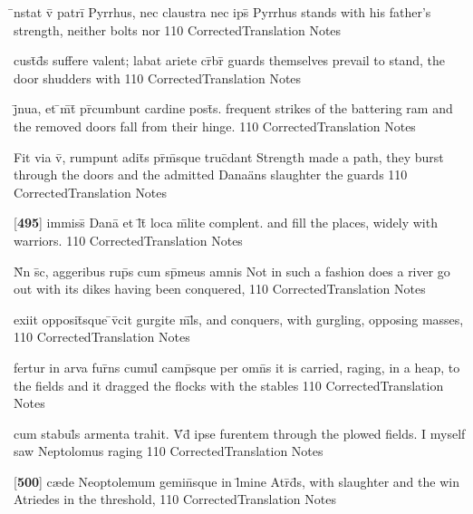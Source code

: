 \latline
  {\={}nstat v\={\macron {\i}} patri\={} Pyrrhus, nec claustra nec ips\={\macron {\i}} }
  { Pyrrhus stands with his father's strength, neither bolts nor  }
  {110}
  { CorrectedTranslation }
  { Notes }


\latline
  {cust\={}d\={}s suffere valent; labat ariete cr\={}br\={}}
  { guards themselves prevail to stand, the door shudders with  }
  {110}
  { CorrectedTranslation }
  { Notes }


\latline
  {j\={}nua, et \={}m\={}t\={\macron {\i}} pr\={}cumbunt cardine post\={}s.}
  { frequent strikes of the battering ram and the removed doors fall from their hinge. }
  {110}
  { CorrectedTranslation }
  { Notes }


\latline
  {Fit via v\={\macron {\i}}, rumpunt adit\={}s pr\={\macron {\i}}m\={}sque truc\={\macron {\i}}dant}
  { Strength made a path, they burst through the doors and the admitted Dana{\"a}ns slaughter the guards }
  {110}
  { CorrectedTranslation }
  { Notes }


\latline
  {[\textbf{495}] immiss\={\macron {\i}} Dana\={\macron {\i}} et l\={}t\={} loca m\={\macron {\i}}lite complent.}
  { and fill the places, widely with warriors. }
  {110}
  { CorrectedTranslation }
  { Notes }


\latline
  {N\={}n s\={\macron {\i}}c, aggeribus rup\={\macron {\i}}s cum sp\={}meus amnis}
  { Not in such a fashion does a river go out with its dikes having been conquered, }
  {110}
  { CorrectedTranslation }
  { Notes }


\latline
  {exiit opposit\={}sque \={}v\={\macron {\i}}cit gurgite m\={}l\={}s,}
  { and conquers, with gurgling, opposing masses, }
  {110}
  { CorrectedTranslation }
  { Notes }


\latline
  {fertur in arva fur\={}ns cumul\={} camp\={}sque per omn\={\macron {\i}}s}
  { it is carried, raging, in a heap, to the fields and it dragged the flocks with the stables   }
  {110}
  { CorrectedTranslation }
  { Notes }


\latline
  {cum stabul\={\macron {\i}}s armenta trahit.  V\={\macron {\i}}d\={\macron {\i}} ipse furentem}
  { through the plowed fields.  I myself saw Neptolomus raging   }
  {110}
  { CorrectedTranslation }
  { Notes }


\latline
  {[\textbf{500}] c{\ae}de Neoptolemum gemin\={}sque in l\={\macron {\i}}mine Atr\={\macron {\i}}d\={}s,}
  { with slaughter and the win Atriedes in the threshold, }
  {110}
  { CorrectedTranslation }
  { Notes }


